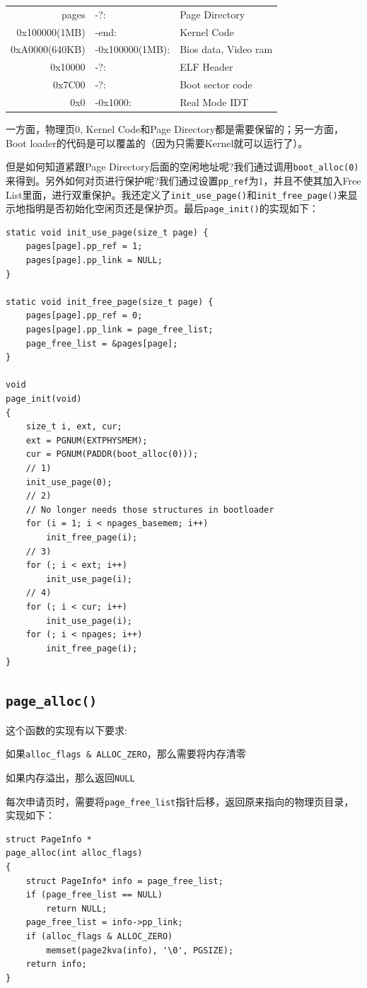 \documentclass[11pt]{article}
\newenvironment{packed_enum}{
\begin{enumerate}
  \setlength{\itemsep}{1pt}
  \setlength{\parskip}{0pt}
  \setlength{\parsep}{0pt}
}{\end{enumerate}}
\begin{document}
\begin{tabular}{rll}
pages&-?: & Page Directory\\
0x100000(1MB) & -end: & Kernel Code\\
0xA0000(640KB) & -0x100000(1MB): & Bios data, Video ram\\
0x10000 & -?: & ELF Header\\
0x7C00 & -?: & Boot sector code\\
0x0 & -0x1000: & Real Mode IDT
\end{tabular}

一方面，物理页0, Kernel Code和Page Directory都是需要保留的；另一方面，Boot loader的代码是可以覆盖的（因为只需要Kernel就可以运行了）。

但是如何知道紧跟Page Directory后面的空闲地址呢?我们通过调用\lstinline|boot_alloc(0)|来得到。另外如何对页进行保护呢?我们通过设置\lstinline|pp_ref|为1，并且不使其加入Free List里面，进行双重保护。我还定义了\lstinline|init_use_page()|和\lstinline|init_free_page()|来显示地指明是否初始化空闲页还是保护页。最后\lstinline|page_init()|的实现如下：
\begin{lstlisting}[title=kern/pmap.c]
static void init_use_page(size_t page) {
	pages[page].pp_ref = 1;
	pages[page].pp_link = NULL;
}

static void init_free_page(size_t page) {
	pages[page].pp_ref = 0;
	pages[page].pp_link = page_free_list;
	page_free_list = &pages[page];
}

void
page_init(void)
{
	size_t i, ext, cur;
	ext = PGNUM(EXTPHYSMEM);
	cur = PGNUM(PADDR(boot_alloc(0)));
	// 1)
	init_use_page(0);
	// 2)
	// No longer needs those structures in bootloader
	for (i = 1; i < npages_basemem; i++)
		init_free_page(i);
	// 3)
	for (; i < ext; i++)
		init_use_page(i);
	// 4)
	for (; i < cur; i++)
		init_use_page(i);
	for (; i < npages; i++)
		init_free_page(i);
}
\end{lstlisting}

\subsection{\lstinline|page_alloc()|}
这个函数的实现有以下要求:
\begin{packed_enum}
\item 如果\lstinline|alloc_flags & ALLOC_ZERO|，那么需要将内存清零
\item 如果内存溢出，那么返回\lstinline|NULL|
\end{packed_enum}
每次申请页时，需要将\lstinline|page_free_list|指针后移，返回原来指向的物理页目录，实现如下：
\begin{lstlisting}[title=kern/pmap.c]
struct PageInfo *
page_alloc(int alloc_flags)
{
	struct PageInfo* info = page_free_list;
	if (page_free_list == NULL)
		return NULL;
	page_free_list = info->pp_link;
	if (alloc_flags & ALLOC_ZERO)
		memset(page2kva(info), '\0', PGSIZE);
	return info;
}
\end{lstlisting}
\end{document}
